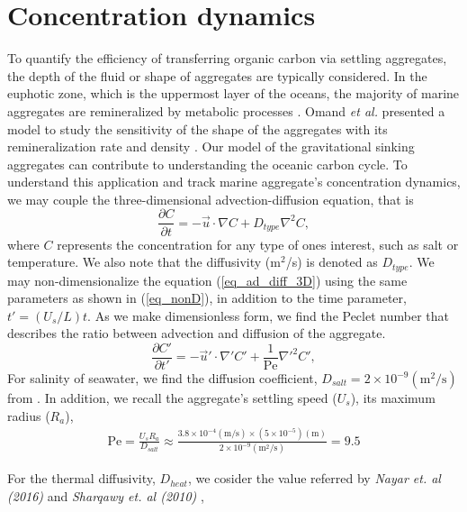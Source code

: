 \section{Concentration dynamics}
To quantify the efficiency of transferring organic carbon via settling aggregates, the depth of the fluid or shape of aggregates are typically considered.
In the euphotic zone, which is the uppermost layer of the oceans, the majority of marine aggregates are remineralized by metabolic processes \cite{henson_global_2012}. Omand {\it{et al.}} presented a model to study the sensitivity of the shape of the aggregates with its remineralization rate and density \cite{omand_sinking_2020}. 
Our model of the gravitational sinking aggregates can contribute to understanding the oceanic carbon cycle. 
To understand this application and track marine aggregate's concentration dynamics, we may couple the three-dimensional advection-diffusion equation, that is 
\begin{equation}
	\frac{\partial C }{\partial t} 
	= - \vec{u} \cdot \nabla C
	+ D_{type} \nabla^2 C,
	\label{eq_ad_diff_3D}
\end{equation} 
where $C$ represents the concentration for any type of ones interest, such as salt or temperature. We also note that the diffusivity (m$^2$/s) is denoted as $D_{type}$.
We may non-dimensionalize the equation (\ref{eq_ad_diff_3D}) using the same parameters as shown in (\ref{eq_nonD}), in addition to the time parameter, $t' = \left(U_s/L \right) t$. As we make dimensionless form, we find the Peclet number that describes the ratio between advection and diffusion of the aggregate. 
\begin{equation}
	\frac{\partial C' }{\partial t'} 
	= - \vec{u}' \cdot \nabla' C'
	+ \frac{1}{\text{Pe}} \nabla'^2 C',
	\label{eq_ad_diff_nonD}
\end{equation}
For salinity of seawater, we find the diffusion coefficient, $D_{salt} = 2 \times 10^{-9}  (\text{m}^2\text{/s})$ from  \cite{wollast_diffusion_1971}. In addition, we recall the aggregate's settling speed ($U_s$), its maximum radius ($R_a$),
\begin{align}
	\text{Pe} 
	= \frac{U_s R_a }{D_{salt}} 
	\approx \frac{3.8 \times 10^{-4}(\text{m/s}) \times \left(5 \times 10^{-5} \right) (\text{m})}{2 \times 10^{-9} (\text{m}^2\text{/s})} = 9.5
\end{align}
\par 
For the thermal diffusivity, $D_{heat}$, we cosider the value referred by {\it Nayar et. al (2016)} \cite{nayar_thermophysical_2016} and {\it Sharqawy et. al (2010)} \cite{sharqawy_thermophysical_2010},
